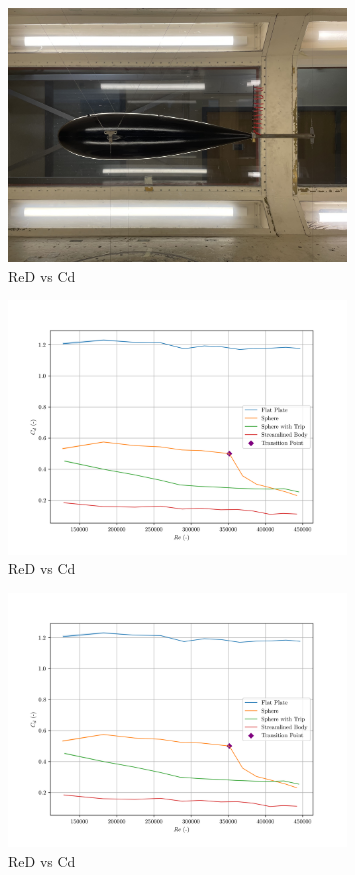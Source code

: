 \documentclass[8pt]{article}
\begin{document}
\begin{figure}[H]
    \centering
    \includegraphics[width=0.8\textwidth]{Images_Videos/Streamlined_8milibar.JPG}
    \caption{ReD vs Cd}
    \label{fig:figure3}
\end{figure}

\begin{figure}[H]
    \centering
    \includegraphics[width=0.8\textwidth]{Re_vs_Cd.png}
    \caption{ReD vs Cd}
    \label{fig:figure4}
\end{figure}

\begin{figure}[H]
    \centering
    \includegraphics[width=0.8\textwidth]{Re_vs_Cd.png}
    \caption{ReD vs Cd}
    \label{fig:figure5}
\end{figure}
\end{document}
